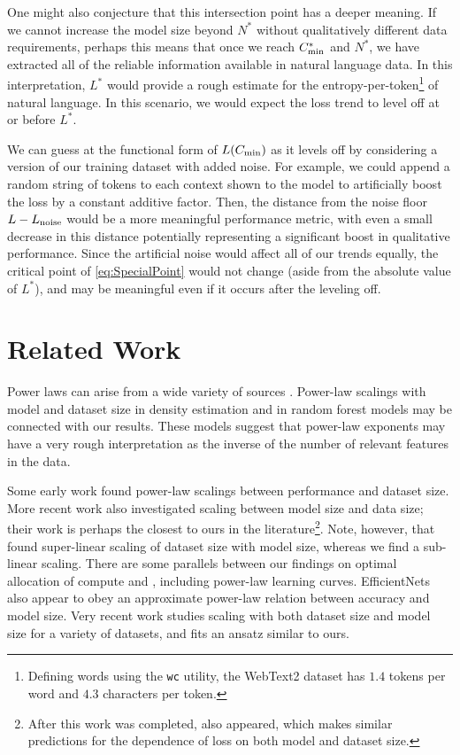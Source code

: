 One might also conjecture that this intersection point has a deeper meaning.  If we cannot increase the model size beyond $N^*$ without qualitatively different data requirements, perhaps this means that once we reach $C_{\rm min}^*$ and $N^*$, we have extracted all of the reliable information available in natural language data.  In this interpretation, $L^*$ would provide a rough estimate for the entropy-per-token\footnote{Defining words using the \texttt{wc} utility, the WebText2 dataset has $1.4$ tokens per word and $4.3$ characters per token. } of natural language.  In this scenario, we would expect the loss trend to level off at or before $L^*$.

We can guess at the functional form of $L(C_{\rm min})$ as it levels off by considering a version of our training dataset with added noise.  For example, we could append a random string of tokens to each context shown to the model to artificially boost the loss by a constant additive factor. Then, the distance from the noise floor $L-L_{\rm noise}$ would be a more meaningful performance metric, with even a small decrease in this distance potentially representing a significant boost in qualitative performance. Since the artificial noise would affect all of our trends equally, the critical point of \ref{eq:SpecialPoint} would not change (aside from the absolute value of $L^*$), and may be meaningful even if it occurs after the leveling off.

\section{Related Work}

Power laws can arise from a wide variety of sources \cite{thurner2018introduction}.  Power-law scalings with model and dataset size in density estimation \cite{wasserman2006all} and  in random forest models \cite{biau2012analysis} may be connected with our results. These models suggest that power-law exponents may have a very rough interpretation as the inverse of the number of relevant features in the data.

Some early \cite{banko2001scaling, DBLP:journals/corr/cs-CL-0108005}   work found power-law scalings between performance and dataset size.  More recent work \cite{1712.00409, Hestness:2019:BHA:3293883.3295710} also investigated scaling between model size and data size; their work is perhaps the closest to ours in the literature\footnote{After this work was completed, \cite{rosenfeld2019constructive} also appeared, which makes similar predictions for the dependence of loss on both model and dataset size.}.  Note, however, that \cite{1712.00409} found super-linear scaling of dataset size with model size, whereas  we find a sub-linear scaling.  There are some parallels between our findings on optimal allocation of compute and \cite{1906.06669}, including power-law learning curves.  EfficientNets \cite{DBLP:journals/corr/abs-1905-11946} also appear to obey an approximate power-law relation between accuracy and model size.  Very recent work \cite{1909.12673} studies scaling with both dataset size and model size for a variety of datasets, and fits an ansatz similar to ours.

